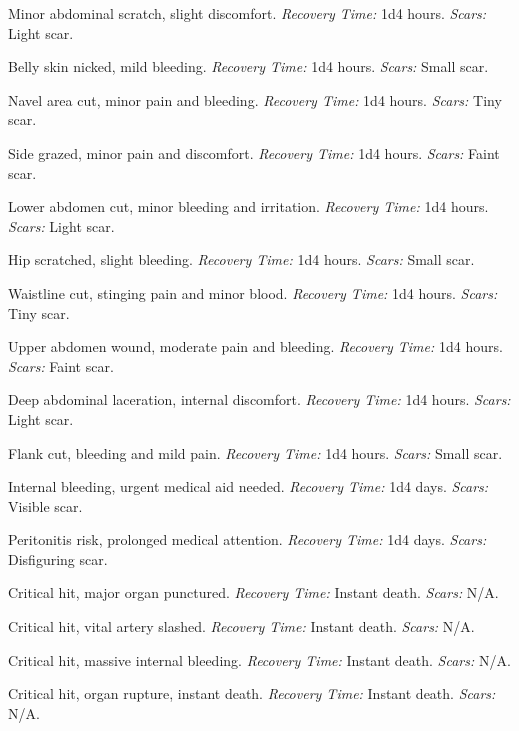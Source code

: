 \documentclass[12pt]{book}
\begin{document}
\begin{description}[labelwidth=1.5em, leftmargin=*, itemsep=0.4em]
    \item[1 -] Minor abdominal scratch, slight discomfort. \textit{Recovery Time:} 1d4 hours. \textit{Scars:} Light scar.
    \item[2 -] Belly skin nicked, mild bleeding. \textit{Recovery Time:} 1d4 hours. \textit{Scars:} Small scar.
    \item[3 -] Navel area cut, minor pain and bleeding. \textit{Recovery Time:} 1d4 hours. \textit{Scars:} Tiny scar.
    \item[4 -] Side grazed, minor pain and discomfort. \textit{Recovery Time:} 1d4 hours. \textit{Scars:} Faint scar.
    \item[5 -] Lower abdomen cut, minor bleeding and irritation. \textit{Recovery Time:} 1d4 hours. \textit{Scars:} Light scar.
    \item[6 -] Hip scratched, slight bleeding. \textit{Recovery Time:} 1d4 hours. \textit{Scars:} Small scar.
    \item[7 -] Waistline cut, stinging pain and minor blood. \textit{Recovery Time:} 1d4 hours. \textit{Scars:} Tiny scar.
    \item[8 -] Upper abdomen wound, moderate pain and bleeding. \textit{Recovery Time:} 1d4 hours. \textit{Scars:} Faint scar.
    \item[9 -] Deep abdominal laceration, internal discomfort. \textit{Recovery Time:} 1d4 hours. \textit{Scars:} Light scar.
    \item[10 -] Flank cut, bleeding and mild pain. \textit{Recovery Time:} 1d4 hours. \textit{Scars:} Small scar.
    \item[11 -] Internal bleeding, urgent medical aid needed. \textit{Recovery Time:} 1d4 days. \textit{Scars:} Visible scar.
    \item[12 -] Peritonitis risk, prolonged medical attention. \textit{Recovery Time:} 1d4 days. \textit{Scars:} Disfiguring scar.
    \item[13 -] Critical hit, major organ punctured. \textit{Recovery Time:} Instant death. \textit{Scars:} N/A.
    \item[14 -] Critical hit, vital artery slashed. \textit{Recovery Time:} Instant death. \textit{Scars:} N/A.
    \item[15 -] Critical hit, massive internal bleeding. \textit{Recovery Time:} Instant death. \textit{Scars:} N/A.
    \item[16 -] Critical hit, organ rupture, instant death. \textit{Recovery Time:} Instant death. \textit{Scars:} N/A.

\end{description}
\end{document}
